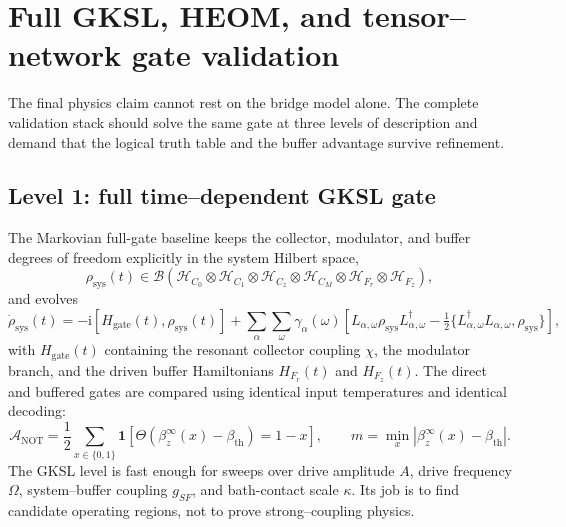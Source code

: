 \documentclass[11pt,a4paper]{article}
\theoremstyle{plain}
\theoremstyle{definition}
\theoremstyle{remark}
\newcommand{\ii}{\mathrm{i}}
\newcommand{\calH}{\mathcal{H}}
\newcommand{\calA}{\mathcal{A}}
\begin{document}
\section{Full GKSL, HEOM, and tensor--network gate validation}
\label{sec:heom-mps-validation}
The final physics claim cannot rest on the bridge model alone. The
complete validation stack should solve the same gate at three levels of
description and demand that the logical truth table and the buffer
advantage survive refinement.

\subsection{Level 1: full time--dependent GKSL gate}
The Markovian full-gate baseline keeps the collector, modulator, and
buffer degrees of freedom explicitly in the system Hilbert space,
\begin{equation}
\rho_{\mathrm{sys}}(t)
\in\mathcal{B}\!\left(
\calH_{C_0}\otimes\calH_{C_1}\otimes\calH_{C_z}
\otimes\calH_{C_M}\otimes\calH_{F_r}\otimes\calH_{F_z}
\right),
\end{equation}
and evolves
\begin{equation}
\dot\rho_{\mathrm{sys}}(t)
=-\ii[H_{\mathrm{gate}}(t),\rho_{\mathrm{sys}}(t)]
+\sum_{\alpha}\sum_{\omega}\gamma_{\alpha}(\omega)
\left[
L_{\alpha,\omega}\rho_{\mathrm{sys}}L_{\alpha,\omega}^{\dagger}
-\tfrac12\{L_{\alpha,\omega}^{\dagger}L_{\alpha,\omega},\rho_{\mathrm{sys}}\}
\right],
\label{eq:full-gksl-gate}
\end{equation}
with $H_{\mathrm{gate}}(t)$ containing the resonant collector coupling
$\chi$, the modulator branch, and the driven buffer Hamiltonians
$H_{F_r}(t)$ and $H_{F_z}(t)$. The direct and buffered gates are compared
using identical input temperatures and identical decoding:
\begin{equation}
\calA_{\mathrm{NOT}}
=\frac12\sum_{x\in\{0,1\}}
\mathbf{1}\!\left[
\Theta(\beta_z^\infty(x)-\beta_{\mathrm{th}})=1-x
\right],
\qquad
m=\min_x|\beta_z^\infty(x)-\beta_{\mathrm{th}}|.
\end{equation}
The GKSL level is fast enough for sweeps over drive amplitude $A$, drive
frequency $\Omega$, system--buffer coupling $g_{SF}$, and bath-contact
scale $\kappa$. Its job is to find candidate operating regions, not to
prove strong--coupling physics.
\end{document}
